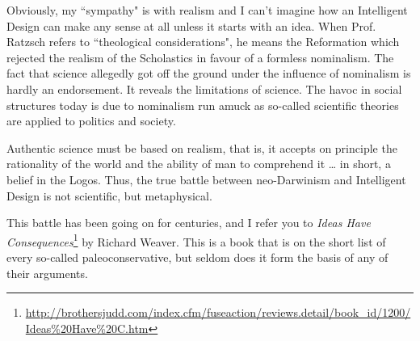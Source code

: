Obviously, my ``sympathy" is with realism and I can't imagine how an Intelligent Design can make any sense at all unless it starts with an idea. When Prof. Ratzsch refers to ``theological considerations", he means the Reformation which rejected the realism of the Scholastics in favour of a formless nominalism. The fact that science allegedly got off the ground under the influence of nominalism is hardly an endorsement. It reveals the limitations of science. The havoc in social structures today is due to nominalism run amuck as so-called scientific theories are applied to politics and society.

Authentic science must be based on realism, that is, it accepts on principle the rationality of the world and the ability of man to comprehend it … in short, a belief in the Logos. Thus, the true battle between neo-Darwinism and Intelligent Design is not scientific, but metaphysical.

This battle has been going on for centuries, and I refer you to \textit{Ideas Have Consequences}\footnote{\url{http://brothersjudd.com/index.cfm/fuseaction/reviews.detail/book_id/1200/Ideas\%20Have\%20C.htm}} by Richard Weaver. This is a book that is on the short list of every so-called paleoconservative, but seldom does it form the basis of any of their arguments.

